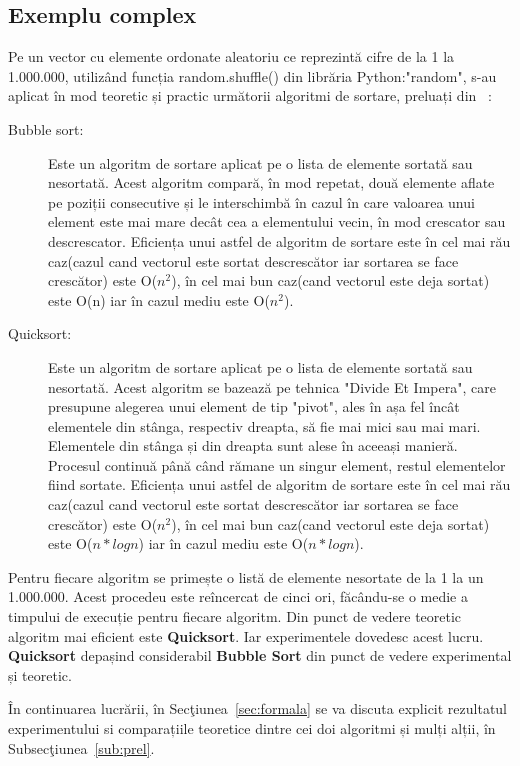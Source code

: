 \documentclass[12pt]{article}
\begin{document}
\subsection{Exemplu complex}
Pe un vector cu elemente ordonate aleatoriu ce reprezintă cifre de la 1 la 1.000.000, utilizând funcția random.shuffle() din librăria Python:"random", s-au aplicat în mod teoretic și practic următorii algoritmi de sortare, preluați din ~\cite{ZAHARIE2008}:
\begin{description}
\item[Bubble sort:]  Este un algoritm de sortare aplicat pe o lista de elemente sortată sau nesortată. Acest algoritm compară, în mod repetat, două elemente aflate pe poziții consecutive și le interschimbă în cazul în care valoarea unui element este mai mare decât cea a elementului vecin, în mod crescator sau descrescator. Eficiența unui astfel de algoritm de sortare este în cel mai rău caz(cazul cand vectorul este sortat descrescător iar sortarea se face crescător) este O($n^2$), în cel mai bun caz(cand vectorul este deja sortat) este O(n) iar în cazul mediu este O($n^2$).
\item[Quicksort: ] Este un algoritm de sortare aplicat pe o lista de elemente sortată sau nesortată. Acest algoritm se bazează pe tehnica "Divide Et Impera",  care presupune alegerea unui element de tip "pivot", ales în așa fel încât elementele din stânga, respectiv dreapta, să fie mai mici sau mai mari. Elementele din stânga și din dreapta sunt alese în aceeași manieră. Procesul continuă până când rămane un singur element, restul elementelor fiind sortate. Eficiența unui astfel de algoritm de sortare este în cel mai rău caz(cazul cand vectorul este sortat descrescător iar sortarea se face crescător) este O($n^2$), în cel mai bun caz(cand vectorul este deja sortat) este O($n*log n$) iar în cazul mediu este O($n*log n$).
\end{description}
Pentru fiecare algoritm se primește o listă de elemente nesortate de la 1 la un 1.000.000. Acest procedeu este reîncercat de cinci ori, făcându-se o medie a timpului de execuție pentru fiecare algoritm. Din punct de vedere teoretic algoritm mai eficient este \textbf{Quicksort}. Iar experimentele dovedesc acest lucru. \textbf{Quicksort} depașind considerabil \textbf{Bubble Sort} din punct de vedere experimental și teoretic.

În continuarea lucrării, în Secţiunea~\ref{sec:formala} se va discuta explicit rezultatul experimentului si comparațiile teoretice dintre cei doi algoritmi și mulți alții, în Subsecţiunea~\ref{sub:prel}.
\end{document}
